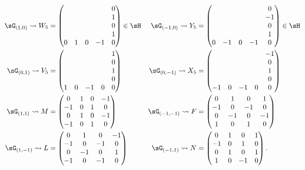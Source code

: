 \begin{equation}		\label{EqGeueuleVWXY}
	\begin{aligned}[]
		\sG_{(1,0)}\leadsto W_5&
		=\begin{pmatrix}
			&&&&0\\
			&&&&1\\
			&&&&0\\
			&&&&1\\
			0&1&0&-1&0
		\end{pmatrix}\in\sH
		&\sG_{(-1,0)}\leadsto Y_5&
		=\begin{pmatrix}
			 	&		&		&		&	0\\ 
			 	&		&		&		&	-1\\ 
			 	&		&		&		&	0\\ 
			 	&		&		&		&	1\\ 
			0	&	-1	&	0	&	-1	&	0 
 		\end{pmatrix}\in\sH\\
		\sG_{(0,1)}\leadsto V_{5}&=
		\begin{pmatrix}
			&&&&1\\
			&&&&0\\
			&&&&1\\
			&&&&0\\
			1&0&-1&0&0
		\end{pmatrix}
		&\sG_{(0,-1)}\leadsto X_5&=
		\begin{pmatrix}
			 	&		&		&		&	-1\\ 
			 	&		&		&		&	0\\ 
			 	&		&		&		&	1\\ 
			 	&		&		&		&	0\\ 
			-1	&	0	&	-1	&	0	&	0 
		\end{pmatrix}\\
		\sG_{(1,1)}\leadsto M&=
		\begin{pmatrix}
			0&1&0&-1\\
			-1&0&1&0\\
			0&1&0&-1\\
			-1&0&1&0
		\end{pmatrix}
		&\sG_{(-1,-1)}\leadsto F&=
		\begin{pmatrix}
			0&1&0&1\\
			-1&0&-1&0\\
			0&-1&0&-1\\
			1&0&1&0
		\end{pmatrix}\\
		\sG_{(1,-1)}\leadsto L&=
		\begin{pmatrix}
			0&1&0&-1\\
			-1&0&-1&0\\
			0&-1&0&1\\
			-1&0&-1&0
		\end{pmatrix}
		&\sG_{(-1,1)}\leadsto N&=
		\begin{pmatrix}
			0&1&0&1\\
			-1&0&1&0\\
			0&1&0&1\\
			1&0&-1&0
		\end{pmatrix}.
	\end{aligned}
\end{equation}
